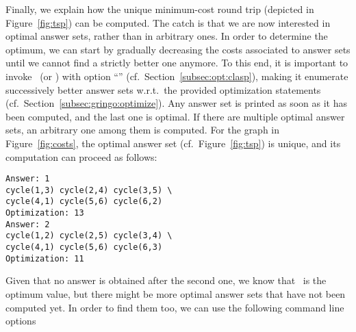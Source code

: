 Finally, we explain how the unique minimum-cost round trip
(depicted in Figure~\ref{fig:tsp}) can be computed.
The catch is that we are now interested in optimal answer sets,
rather than in arbitrary ones.
In order to determine the optimum, we can start by gradually
decreasing the costs associated to answer sets
until we cannot find a strictly better one anymore.
To this end, it is important to invoke \clasp\ (or \clingo)
with option ``'' (cf.\ Section~\ref{subsec:opt:clasp}),
making it enumerate successively better answer sets
w.r.t.\ the provided optimization statements (cf.\ Section~\ref{subsec:gringo:optimize}).
Any answer set is printed as soon as it has been computed,
and the last one is optimal.
If there are multiple optimal answer sets, an arbitrary one among them is computed.
For the graph in Figure~\ref{fig:costs},
the optimal answer set (cf.\ Figure~\ref{fig:tsp}) is unique,
and its computation can proceed as follows:%
%
\begin{lstlisting}[numbers=none]
Answer: 1
cycle(1,3) cycle(2,4) cycle(3,5) \
cycle(4,1) cycle(5,6) cycle(6,2)
Optimization: 13
Answer: 2
cycle(1,2) cycle(2,5) cycle(3,4) \
cycle(4,1) cycle(5,6) cycle(6,3)
Optimization: 11
\end{lstlisting}
%
Given that no answer is obtained after the second one,
we know that~ is the optimum value,
but there might be more optimal answer sets that have not been computed yet.
In order to find them too, we can use the following command line options
